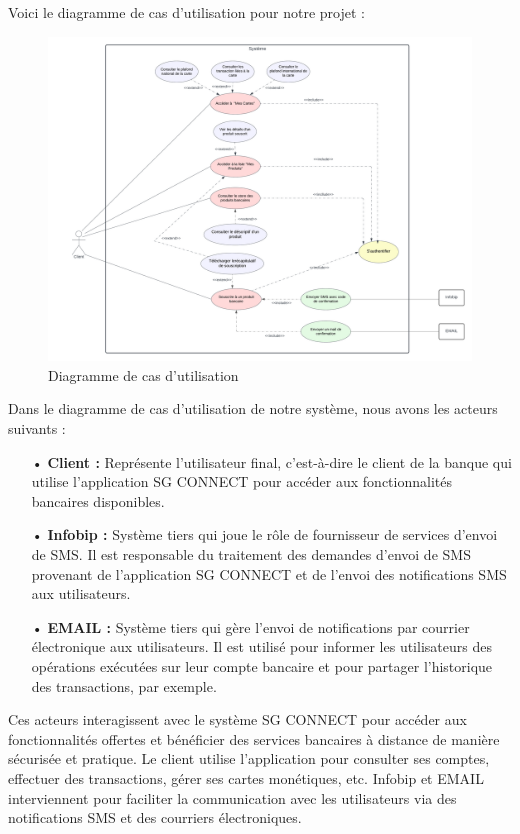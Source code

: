 Voici le diagramme de cas d'utilisation pour notre projet :

\begin{figure}[!h]
    \centering %
        \includegraphics[width=16cm]{images/diagramms/useCase.png}
    \caption{Diagramme de cas d'utilisation}
\end{figure}
\newpage

Dans le diagramme de cas d'utilisation de notre système, nous avons les acteurs suivants :

\begin{itemize}
    \item[•] \textbf{Client :}  Représente l'utilisateur final, c'est-à-dire le client de la banque qui utilise l'application SG CONNECT pour accéder aux fonctionnalités bancaires disponibles.
    \item[•] \textbf{Infobip :} Système tiers qui joue le rôle de fournisseur de services d'envoi de SMS. Il est responsable du traitement des demandes d'envoi de SMS provenant de l'application SG CONNECT et de l'envoi des notifications SMS aux utilisateurs.
    \item[•] \textbf{EMAIL :} Système tiers qui gère l'envoi de notifications par courrier électronique aux utilisateurs. Il est utilisé pour informer les utilisateurs des opérations exécutées sur leur compte bancaire et pour partager l'historique des transactions, par exemple.
\end{itemize}

Ces acteurs interagissent avec le système SG CONNECT pour accéder aux fonctionnalités offertes et bénéficier des services bancaires à distance de manière sécurisée et pratique. Le client utilise l'application pour consulter ses comptes, effectuer des transactions, gérer ses cartes monétiques, etc. Infobip et EMAIL interviennent pour faciliter la communication avec les utilisateurs via des notifications SMS et des courriers électroniques.\\

